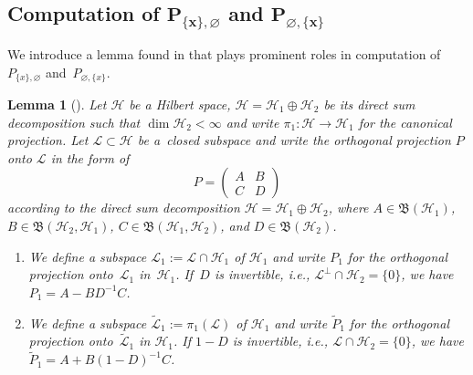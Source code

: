 \documentclass[11pt]{article}
\numberwithin{equation}{section}
\numberwithin{equation}{section}
\newtheorem{Lemma}[Theorem]{Lemma}
\newcommand{\mfrak}[1]{\mathfrak{#1}}
\newcommand{\mcal}[1]{\mathcal{#1}}
\begin{document}
\subsection[Computation of P(x,0) and P(0,x)]{Computation of $\boldsymbol{P_{\{x\},\varnothing}}$ and $\boldsymbol{P_{\varnothing,\{x\}}}$}

We introduce a lemma found in \cite[Section~7]{BufetovOlshanski2019} that plays prominent roles in computation of~$P_{\{x\},\varnothing}$ and~$P_{\varnothing,\{x\}}$.
\begin{Lemma}[\cite{BufetovOlshanski2019}]\label{lem:projection_reduction_formula}
Let $\mcal{H}$ be a Hilbert space, $\mcal{H}=\mcal{H}_{1}\oplus \mcal{H}_{2}$ be its direct sum decomposition such that $\dim \mcal{H}_{2}<\infty$ and write $\pi_{1}\colon \mcal{H}\to\mcal{H}_{1}$ for the canonical projection. Let $\mcal{L}\subset \mcal{H}$ be a~closed subspace and write the orthogonal projection $P$ onto $\mcal{L}$ in the form of
\begin{equation*}
	P=\left(
	\begin{matrix}
	A & B \\
	C & D
	\end{matrix}
	\right)
\end{equation*}
according to the direct sum decomposition $\mcal{H}=\mcal{H}_{1}\oplus \mcal{H}_{2}$, where $A\in \mfrak{B}(\mcal{H}_{1})$, $B\in \mfrak{B}(\mcal{H}_{2},\mcal{H}_{1})$, $C\in \mfrak{B}(\mcal{H}_{1},\mcal{H}_{2})$, and $D\in \mfrak{B}(\mcal{H}_{2})$.
\begin{enumerate}\itemsep=0pt
\item[$1.$] 	We define a subspace $\mcal{L}_{1}:=\mcal{L}\cap \mcal{H}_{1}$ of $\mcal{H}_{1}$ and write $P_{1}$ for the orthogonal projection onto~$\mcal{L}_{1}$ in~$\mcal{H}_{1}$. If~$D$ is invertible, i.e., $\mcal{L}^{\perp}\cap\mcal{H}_{2}=\{0\}$, we have $P_{1}=A-BD^{-1}C$.
\item[$2.$] 	We define a subspace $\widetilde{\mcal{L}}_{1}:=\pi_{1}(\mcal{L})$ of $\mcal{H}_{1}$ and write $\widetilde{P}_{1}$ for the orthogonal projection onto~$\widetilde{\mcal{L}}_{1}$ in $\mcal{H}_{1}$. If $1-D$ is invertible, i.e., $\mcal{L}\cap\mcal{H}_{2}=\{0\}$, we have $\widetilde{P}_{1}=A+B(1-D)^{-1}C$.
\end{enumerate}
\end{Lemma}
\end{document}
